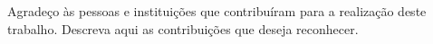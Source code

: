 \clearpage
\begin{agradecimentos}
Agradeço às pessoas e instituições que contribuíram para a realização deste
trabalho. Descreva aqui as contribuições que deseja reconhecer.
\end{agradecimentos}
\clearpage
